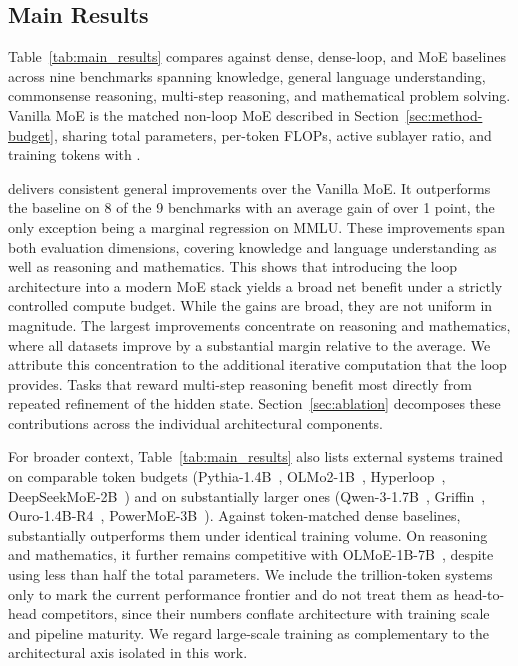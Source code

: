 \subsection{Main Results}
\label{sec:main_result}

Table~\ref{tab:main_results} compares \ourmodel against dense, dense-loop, and MoE baselines across nine benchmarks spanning knowledge, general language understanding, commonsense reasoning, multi-step reasoning, and mathematical problem solving. Vanilla MoE is the matched non-loop MoE described in Section~\ref{sec:method-budget}, sharing total parameters, per-token FLOPs, active sublayer ratio, and training tokens with \ourmodelnospace.

\ourmodel delivers consistent general improvements over the Vanilla MoE. It outperforms the baseline on 8 of the 9 benchmarks with an average gain of over 1 point, the only exception being a marginal regression on MMLU. These improvements span both evaluation dimensions, covering knowledge and language understanding as well as reasoning and mathematics. This shows that introducing the loop architecture into a modern MoE stack yields a broad net benefit under a strictly controlled compute budget. While the gains are broad, they are not uniform in magnitude. The largest improvements concentrate on reasoning and mathematics, where all datasets improve by a substantial margin relative to the average. We attribute this concentration to the additional iterative computation that the loop provides. Tasks that reward multi-step reasoning benefit most directly from repeated refinement of the hidden state. Section~\ref{sec:ablation} decomposes these contributions across the individual architectural components.

For broader context, Table~\ref{tab:main_results} also lists external systems trained on comparable token budgets (Pythia-1.4B~\cite{biderman2023pythia}, OLMo2-1B~\cite{olmo20242}, Hyperloop~\cite{zeitoun2026hyperloop}, DeepSeekMoE-2B~\cite{dai2024deepseekmoe}) and on substantially larger ones (Qwen-3-1.7B~\cite{yang2025qwen3}, Griffin~\cite{de2024griffin}, Ouro-1.4B-R4~\cite{zhu2025scaling}, PowerMoE-3B~\cite{shen2024power}). Against token-matched dense baselines, \ourmodel substantially outperforms them under identical training volume. On reasoning and mathematics, it further remains competitive with OLMoE-1B-7B~\cite{muennighoff2025olmoe}, despite using less than half the total parameters. We include the trillion-token systems only to mark the current performance frontier and do not treat them as head-to-head competitors, since their numbers conflate architecture with training scale and pipeline maturity. We regard large-scale training as complementary to the architectural axis isolated 
in this work.

